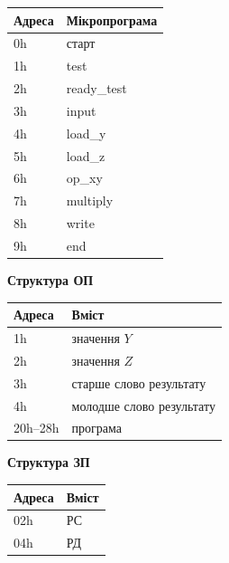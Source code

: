 \documentclass[12pt,a4paper]{article}
\begin{document}
\begin{center}
\begin{minipage}[t]{0.47\textwidth}
\vspace{0.4em}
\small
\begin{tabular}{|C{1.5cm}|p{4.7cm}|}
    \hline
    \textbf{Адреса} & \textbf{Мікропрограма} \\
    \hline
    0h & старт \\
    \hline
    1h & test \\
    \hline
    2h & ready\_test \\
    \hline
    3h & input \\
    \hline
    4h & load\_y \\
    \hline
    5h & load\_z \\
    \hline
    6h & op\_xy \\
    \hline
    7h & multiply \\
    \hline
    8h & write \\
    \hline
    9h & end \\
    \hline
\end{tabular}
\end{minipage}
\end{center}

\vspace{1em}

\begin{center}
\begin{minipage}[t]{0.47\textwidth}
\centering
\textbf{Структура ОП}

\vspace{0.4em}
\small
\begin{tabular}{|C{1.5cm}|p{4.8cm}|}
    \hline
    \textbf{Адреса} & \textbf{Вміст} \\
    \hline
    1h & значення $Y$ \\
    \hline
    2h & значення $Z$ \\
    \hline
    3h & старше слово результату \\
    \hline
    4h & молодше слово результату \\
    \hline
    20h--28h & програма \\
    \hline
\end{tabular}
\end{minipage}
\hfill
\begin{minipage}[t]{0.47\textwidth}
\centering
\textbf{Структура ЗП}

\vspace{0.4em}
\small
\begin{tabular}{|C{1.5cm}|p{4.8cm}|}
    \hline
    \textbf{Адреса} & \textbf{Вміст} \\
    \hline
    02h & РС \\
    \hline
    04h & РД \\
    \hline
\end{tabular}
\end{minipage}
\end{center}
\end{document}
